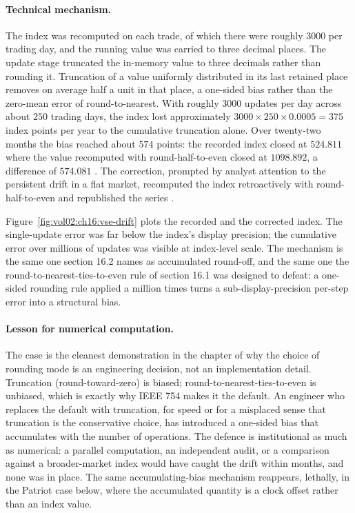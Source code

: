 \paragraph{Technical mechanism.}
The index was recomputed on each trade, of which there were roughly
$3000$ per trading day, and the running value was carried to three
decimal places. The update stage truncated the in-memory value to
three decimals rather than rounding it. Truncation of a value
uniformly distributed in its last retained place removes on average
half a unit in that place, a one-sided bias rather than the
zero-mean error of round-to-nearest. With roughly $3000$ updates per
day across about $250$ trading days, the index lost approximately
$3000 \times 250 \times 0.0005 = 375$ index points per year to the
cumulative truncation alone. Over twenty-two months the bias reached
about $574$ points: the recorded index closed at $524.811$ where the
value recomputed with round-half-to-even closed at $1098.892$, a
difference of $574.081$ \cite{paper:quinn-vse-1983}. The correction,
prompted by analyst attention to the persistent drift in a flat
market, recomputed the index retroactively with round-half-to-even
and republished the series \cite{web:cnn-vse-archive}.



Figure~\ref{fig:vol02:ch16:vse-drift} plots the recorded and the
corrected index. The single-update error was far below the index's
display precision; the cumulative error over millions of updates was
visible at index-level scale. The mechanism is the same one section
16.2 names as accumulated round-off, and the same one the
round-to-nearest-ties-to-even rule of section 16.1 was designed to
defeat: a one-sided rounding rule applied a million times turns a
sub-display-precision per-step error into a structural bias.

\paragraph{Lesson for numerical computation.}
The case is the cleanest demonstration in the chapter of why the
choice of rounding mode is an engineering decision, not an
implementation detail. Truncation (round-toward-zero) is biased;
round-to-nearest-ties-to-even is unbiased, which is exactly why IEEE
754 makes it the default. An engineer who replaces the default with
truncation, for speed or for a misplaced sense that truncation is
the conservative choice, has introduced a one-sided bias that
accumulates with the number of operations. The defence is
institutional as much as numerical: a parallel computation, an
independent audit, or a comparison against a broader-market index
would have caught the drift within months, and none was in place.
The same accumulating-bias mechanism reappears, lethally, in the
Patriot case below, where the accumulated quantity is a clock offset
rather than an index value.

